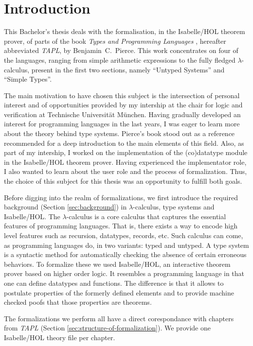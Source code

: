 \section{Introduction}

This Bachelor's thesis deals with the formalisation, in the Isabelle/HOL theorem prover, of parts of
the book \emph{Types and Programming Languages} \cite{pierce-2002-TAPL}, hereafter abbreviated
\emph{TAPL}, by Benjamin~C.~Pierce. This work concentrates on four of the languages, ranging from
simple arithmetic expressions to the fully fledged $\lambda$-calculus, present in the first two
sections, namely ``Untyped Systems'' and ``Simple Types''.

The main motivation to have chosen this subject is the intersection of personal interest and of
opportunities provided by my intership at the chair for logic and verification at Technische
Universität München. Having gradually developed an interest for programming languages in the last
years, I was eager to learn more about the theory behind type systems. Pierce's book stood out as
a reference recommended for a deep introduction to the main elements of this field. Also, as part of
my intership, I worked on the implementation of the (co)datatype module in the Isabelle/HOL
theorem prover. Having experienced the implementator role, I also wanted to learn about the user
role and the process of formalization. Thus, the choice of this subject for this thesis was an
opportunity to fulfill both goals.

Before digging into the realm of formalizations, we first introduce the required background (Section
\ref{sec:background}) in $\lambda$-calculus, type systems and Isabelle/HOL. The $\lambda$-calculus
is a core calculus that captures the essential features of programming languages. That is, there
exists a way to encode high level features such as recursion, datatypes, records, etc. Such calculus
can come, as programming languages do, in two variants: typed and untyped. A type system is a
syntactic method for automatically checking the absence of certain erroneous behaviors. To formalize
these we used Isabelle/HOL, an interactive theorem prover based on higher order logic. It resembles
a programming language in that one can define datatypes and functions. The difference is that it
allows to postulate properties of the formerly defined elements and to provide machine checked poofs
that those properties are theorems.

The formalizations we perform all have a direct corespondance with chapters from \emph{TAPL}
(Section \ref{sec:structure-of-formalization}). We provide one Isabelle/HOL theory file per chapter.

